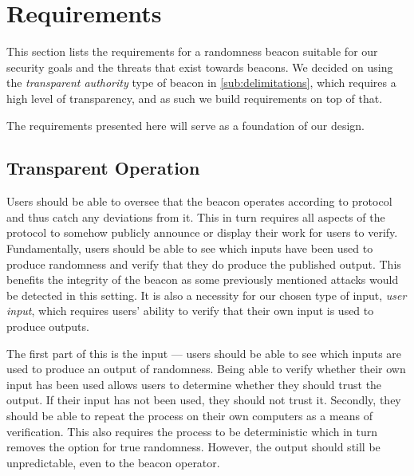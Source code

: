 \section{Requirements}%
\label{sec:beacon_requirements}
This section lists the requirements for a randomness beacon suitable for our security goals and the threats that exist towards beacons.
We decided on using the \emph{transparent authority} type of beacon in \cref{sub:delimitations}, which requires a high level of transparency, and as such we build requirements on top of that.

The requirements presented here will serve as a foundation of our design.


\subsection{Transparent Operation}
Users should be able to oversee that the beacon operates according to protocol and thus catch any deviations from it.
This in turn requires all aspects of the protocol to somehow publicly announce or display their work for users to verify.
Fundamentally, users should be able to see which inputs have been used to produce randomness and verify that they do produce the published output.
This benefits the integrity of the beacon as some previously mentioned attacks would be detected in this setting.
It is also a necessity for our chosen type of input, \emph{user input}, which requires users' ability to verify that their own input is used to produce outputs.

The first part of this is the input --- users should be able to see which inputs are used to produce an output of randomness.
Being able to verify whether their own input has been used allows users to determine whether they should trust the output.
If their input has not been used, they should not trust it.
Secondly, they should be able to repeat the process on their own computers as a means of verification.
This also requires the process to be deterministic which in turn removes the option for true randomness.
However, the output should still be unpredictable, even to the beacon operator.

